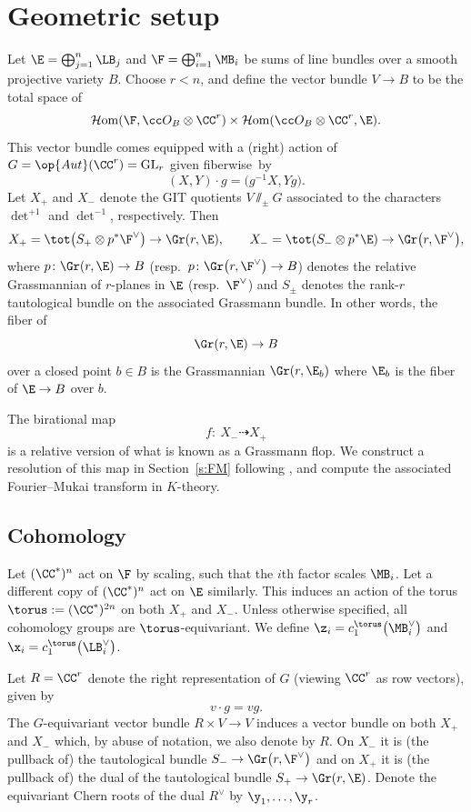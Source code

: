 \section{Geometric setup}\label{gs}
Let $\E = \bigoplus_{j=1}^n \LB_j$ and $\F = \bigoplus_{i=1}^n \MB_i$ be sums of line bundles over a smooth projective variety $B$. Choose $r < n$, and define the vector bundle $V \to B$ to be the total space of
\[
\mathcal{H}{\rm om}(\F, \cc O_B \otimes \CC^r) \times \mathcal{H}{\rm om}(\cc O_B \otimes \CC^r, \E).
\]
This vector bundle comes equipped with a (right) action of $G = \op{Aut}(\CC^r) = {\rm GL}_r$ given fiberwise~by
\[
(X, Y)\cdot g = \bigl( g^{-1}X, Yg\bigr).
\]
Let $X_+$ and $X_-$ denote the GIT quotients $V\sslash_\pm G$ associated to the characters $\det^{+1}$ and $\det^{-1}$, respectively. Then
\begin{align*}
X_+ = \tot\bigl(S_+ \otimes p^*\F^\vee\bigr) \to \Gr(r, \E) ,\qquad
X_- =\tot(S_- \otimes p^*\E) \to \Gr\bigl(r, \F^\vee\bigr),
\end{align*}
where $p\colon \Gr(r, \E) \to B $ \big(resp.\ $p\colon \Gr\bigl(r, \F^\vee\bigr) \to B$\big) denotes the relative Grassmannian of $r$-planes in $\E$ \big(resp.\ $\F^\vee$\big) and $S_\pm$ denotes the rank-$r$ tautological bundle on the associated Grassmann bundle. In other words, the fiber of
\[
\Gr(r, \E) \to B
\]
over a closed point $b \in B$ is the Grassmannian $\Gr(r, \E_b)$ where $\E_b$ is the fiber of $\E \to B$ over $b$.



The birational map
\[
f\colon \ X_{-}\dashrightarrow X_{+}
\]
is a relative version of what is known as a Grassmann flop. We construct a resolution of this map in Section~\ref{s:FM} following \cite{BLV}, and compute the associated Fourier--Mukai transform in $K$-theory.

\subsection{Cohomology}\label{s:coh}
Let $(\CC^*)^n$ act on $\F$ by scaling, such that the $i$th factor scales $\MB_i$. Let a different copy of $(\CC^*)^n$ act on $\E$ similarly.
This induces an action of the torus $\torus:= (\CC^*)^{2n}$ on both $X_+$ and $X_-$. Unless otherwise specified, all cohomology groups are $\torus$-equivariant. We define $\z_i = c_1^\torus\bigl(\MB_i^\vee\bigr)$ and $\x_i = c_1^\torus\bigl(\LB_i^\vee\bigr)$.

Let $R = \CC^r$ denote the right representation of $G$ (viewing $\CC^r$ as row vectors), given by
\begin{equation} \label{e:srep}
v\cdot g = vg
.\end{equation}
The $G$-equivariant vector bundle $R \times V \to V$ induces a vector bundle on both $X_+$ and $X_-$ which, by abuse of notation, we also denote by $R$. On $X_-$ it is (the pullback of) the tautological bundle $S_- \to \Gr\bigl(r, \F^\vee\bigr)$ and on $X_+$ it is (the pullback of) the dual of the tautological bundle $S_+ \to \Gr(r, \E)$. Denote the equivariant Chern roots of the dual $R^\vee$ by $\y_1, \dots , \y_r$.


